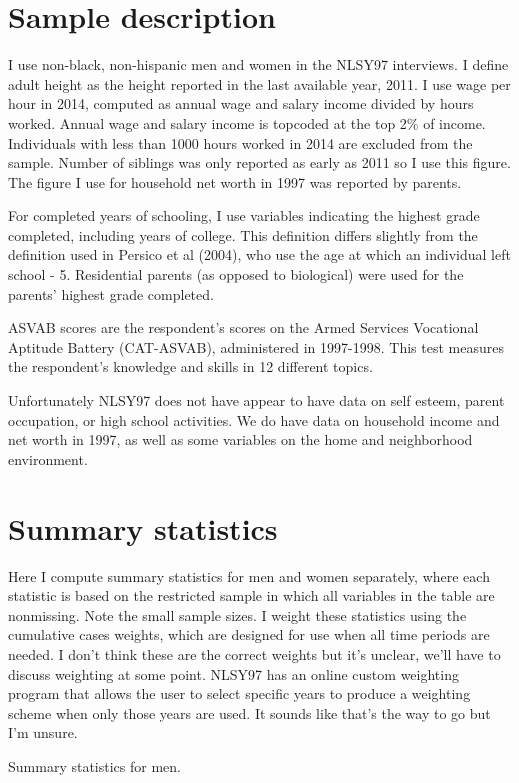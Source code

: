 \documentclass{article}
\begin{document}
\section{Sample description}
I use non-black, non-hispanic men and women in the NLSY97 interviews. I define adult height as the height reported in the last available year, 2011. I use wage per hour in 2014, computed as annual wage and salary income divided by hours worked. Annual wage and salary income is topcoded at the top 2\% of income. Individuals with less than 1000 hours worked in 2014 are excluded from the sample. Number of siblings was only reported as early as 2011 so I use this figure. The figure I use for household net worth in 1997 was reported by parents.

For completed years of schooling, I use variables indicating the highest grade completed, including years of college. This definition differs slightly from the definition used in Persico et al (2004), who use the age at which an individual left school - 5. Residential parents (as opposed to biological) were used for the parents' highest grade completed.

ASVAB scores are the respondent's scores on the Armed Services Vocational Aptitude Battery (CAT-ASVAB), administered in 1997-1998. This test measures the respondent's knowledge and skills in 12 different topics.

Unfortunately NLSY97 does not have appear to have data on self esteem, parent occupation, or high school activities. We do have data on household income and net worth in 1997, as well as some variables on the home and neighborhood environment.

\section{Summary statistics}
Here I compute summary statistics for men and women separately, where each statistic is based on the restricted sample in which all variables in the table are nonmissing. Note the small sample sizes. I weight these statistics using the cumulative cases weights, which are designed for use when all time periods are needed. I don't think these are the correct weights but it's unclear, we'll have to discuss weighting at some point. NLSY97 has an online custom weighting program that allows the user to select specific years to produce a weighting scheme when only those years are used. It sounds like that's the way to go but I'm unsure.

\begin{table}[h]
\label{tab:summary_men}
\caption{Summary statistics for men.}

\end{table}
\end{document}
